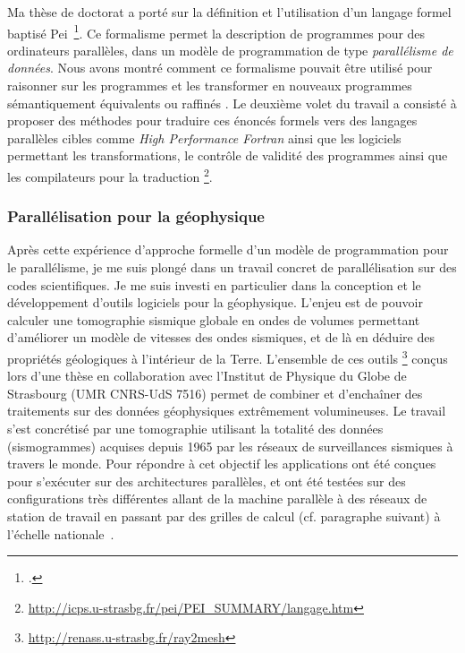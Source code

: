 \documentclass[11pt]{article}
\begin{document}
Ma thèse de doctorat \cite{icps-1997-4} a porté sur la définition et l'utilisation d'un 
langage formel baptis\'e Pei~\footcite{Violard92}.  Ce formalisme permet la description 
de programmes pour des ordinateurs parallèles, dans un modèle de programmation de type 
\emph{parallélisme de données}. Nous avons montré comment ce formalisme pouvait être utilisé 
pour raisonner sur les programmes et les transformer en nouveaux programmes sémantiquement 
équivalents ou raffinés \cite{icps-1994-46,icps-1995-1,icps-1997-3,icps-1996-2}.
Le deuxième volet du travail a consisté à proposer des méthodes pour traduire \cite{icps-1998-5}
ces énoncés formels vers des langages parallèles cibles comme \textit{High Performance Fortran}
ainsi que les logiciels permettant les transformations, le contrôle de validité des 
programmes ainsi que les compilateurs pour la traduction%
\footnote{\url{http://icps.u-strasbg.fr/pei/PEI_SUMMARY/langage.htm}}.

\subsubsection{Parallélisation pour la géophysique}

Après cette expérience d'approche formelle d'un modèle de programmation pour le parallélisme,
je me suis plongé dans un travail concret de parallélisation sur des codes scientifiques.
Je me suis investi en particulier dans la conception et le développement d'outils logiciels pour la 
géophysique. L'enjeu est de pouvoir calculer une tomographie sismique globale en ondes de volumes 
permettant d'améliorer un modèle de vitesses des ondes sismiques, et de là
en déduire des propriétés géologiques à l'intérieur de la Terre. 
L'ensemble de ces outils%
\footnote{\url{http://renass.u-strasbg.fr/ray2mesh}}
conçus lors d'une thèse en collaboration avec l'Institut de Physique du Globe
de Strasbourg (UMR CNRS-UdS 7516) permet de combiner et d'enchaîner des traitements sur 
des données géophysiques extrêmement volumineuses. 
Le travail s'est concrétisé par une tomographie utilisant la totalité des données 
(sismogrammes) acquises depuis 1965 par les réseaux de surveillances sismiques à travers le monde. 
Pour répondre à cet objectif les applications ont été conçues pour s'exécuter sur des architectures 
parallèles, et ont été testées sur des configurations très différentes allant de la machine 
parallèle à des réseaux de station de travail en passant par des grilles de calcul (cf.
paragraphe suivant) à l'échelle nationale~\cite{icps-2005-146,icps-2007-184}.  
\end{document}
